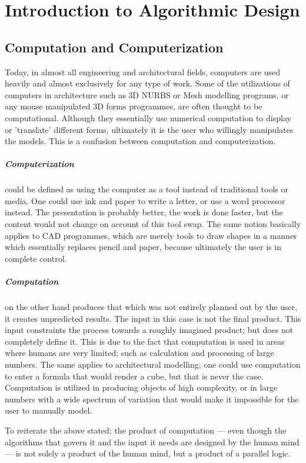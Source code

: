 \chapter{Introduction to Algorithmic Design}

\section{Computation and Computerization}

Today, in almost all engineering and architectural fields, computers are used heavily and almost
exclusively for any type of work. Some of the utilizations of computers in architecture such as 3D
NURBS or Mesh modelling programs, or any mouse manipulated 3D forms programmes, are often thought to
be computational. Although they essentially use numerical computation to display or 'translate'
\cite{terzidis06} different forms, ultimately it is the user who willingly manipulates the models.
This is a confusion between computation and computerization. 

\paragraph{Computerization}could be defined as using the computer as a tool instead of traditional
tools or media. One could use ink and paper to write a letter, or use a word processor instead. The
presentation is probably better, the work is done faster, but the content would not change on
account of this tool swap. The same notion basically applies to CAD programmes, which are merely
tools to draw shapes in a manner which essentially replaces pencil and paper, because ultimately the
user is in complete control.

\paragraph{Computation}on the other hand produces that which was not entirely planned out by the
user, it creates unpredicted results. The input in this case is not the final product. This input constraints
the process towards a roughly imagined product; but does not completely define it. This is due to the
fact that computation is used in areas where humans are very limited; such as calculation and
processing of large numbers. The same applies to architectural modelling; one could use computation
to enter a formula that would render a cube, but that is never the case. Computation is utilized in
producing objects of high complexity, or in large numbers with a wide spectrum of variation that
would make it impossible for the user to manually model.

To reiterate the above stated; the product of computation --- even though the algorithms that govern
it and the input it needs are designed by the human mind --- is not solely a product of the human mind, but a product of
a parallel logic.
